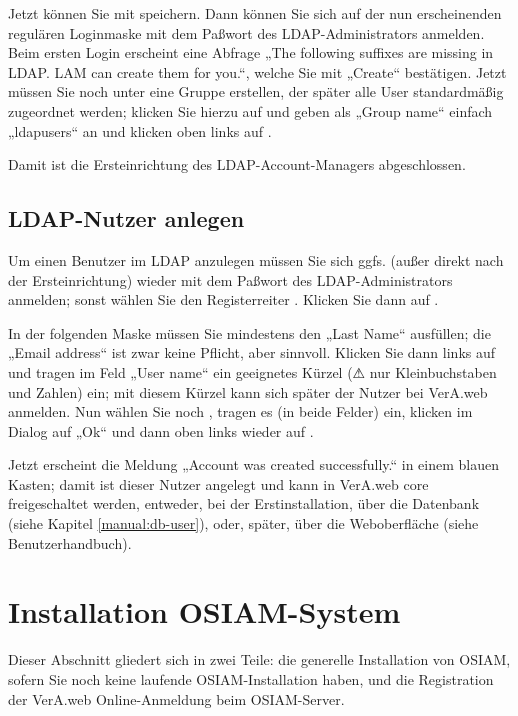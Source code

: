 Jetzt können Sie mit  speichern. Dann können
Sie sich auf der nun erscheinenden regulären Loginmaske mit dem Paßwort
des LDAP-Administrators anmelden. Beim ersten Login erscheint eine
Abfrage „The following suffixes are missing in LDAP. LAM can create them
for you.“, welche Sie mit „Create“ bestätigen. Jetzt müssen Sie noch
unter  eine Gruppe erstellen, der später
alle User standardmäßig zugeordnet werden; klicken Sie hierzu auf
 und geben als „Group name“ einfach
„ldapusers“ an und klicken oben links auf .

Damit ist die Ersteinrichtung des LDAP-Account-Managers abgeschlossen.

\subsection{LDAP-Nutzer anlegen}\label{subsec:setup-lam-adduser}

Um einen Benutzer im LDAP anzulegen müssen Sie sich ggfs. (außer direkt
nach der Ersteinrichtung) wieder mit dem Paßwort des LDAP-Administrators
anmelden; sonst wählen Sie den Registerreiter .
Klicken Sie dann auf .

In der folgenden Maske müssen Sie mindestens den „Last Name“ ausfüllen;
die „Email address“ ist zwar keine Pflicht, aber sinnvoll.
Klicken Sie dann links auf  und tragen im Feld
„User name“ ein geeignetes Kürzel (⚠ nur Kleinbuchstaben und Zahlen) ein;
mit diesem Kürzel kann sich später der Nutzer bei VerA.web anmelden. Nun
wählen Sie noch , tragen es (in beide
Felder) ein, klicken im Dialog auf „Ok“ und dann oben links wieder auf
.

Jetzt erscheint die Meldung „Account was created successfully.“ in einem
blauen Kasten; damit ist dieser Nutzer angelegt und kann in VerA.web core
freigeschaltet werden, entweder, bei der Erstinstallation, über die
Datenbank (siehe Kapitel \ref{manual:db-user}), oder, später, über die
Weboberfläche (siehe Benutzerhandbuch).

\ifoa
\section{Installation OSIAM-System}\label{sec:setup-osiam}

Dieser Abschnitt gliedert sich in zwei Teile: die generelle Installation
von OSIAM, sofern Sie noch keine laufende OSIAM-Installation haben, und
die Registration der VerA.web Online-Anmeldung beim OSIAM-Server.

